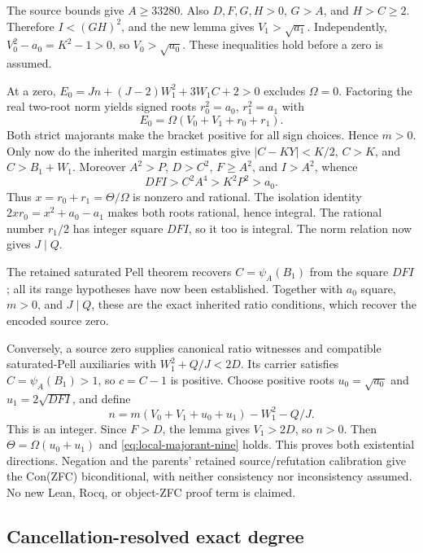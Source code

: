The source bounds give $A\ge33280$. Also $D,F,G,H>0$, $G>A$, and
$H>C\ge2$. Therefore $I<(GH)^2$, and the new lemma gives
$V_1>\sqrt{a_1}$. Independently,
$V_0^2-a_0=K^2-1>0$, so $V_0>\sqrt{a_0}$.
These inequalities hold before a zero is assumed.

At a zero, $E_0=Jn+(J-2)W_1^2+3W_1C+2>0$ excludes $\Omega=0$.
Factoring the real two-root norm yields signed roots
$r_0^2=a_0$, $r_1^2=a_1$ with
\[
 E_0=\Omega(V_0+V_1+r_0+r_1).
\]
Both strict majorants make the bracket positive for all sign choices.
Hence $m>0$. Only now do the inherited margin estimates give
$|C-KY|<K/2$, $C>K$, and $C>B_1+W_1$.
Moreover $A^2>P$, $D>C^2$, $F\ge A^2$, and $I>A^2$, whence
\[
 DFI>C^2A^4>K^2P^2>a_0.
\]
Thus $x=r_0+r_1=\Theta/\Omega$ is nonzero and rational. The isolation
identity $2xr_0=x^2+a_0-a_1$ makes both roots rational, hence integral.
The rational number $r_1/2$ has integer square $DFI$, so it too is
integral. The norm relation now gives $J\mid Q$.

The retained saturated Pell theorem recovers $C=\psi_A(B_1)$ from the
square $DFI$; all its range hypotheses have now been established.
Together with $a_0$ square, $m>0$, and $J\mid Q$, these are the exact
inherited ratio conditions, which recover the encoded source zero.

Conversely, a source zero supplies canonical ratio witnesses and compatible
saturated-Pell auxiliaries with $W_1^2+Q/J<2D$. Its carrier satisfies
$C=\psi_A(B_1)>1$, so $c=C-1$ is positive. Choose positive roots
$u_0=\sqrt{a_0}$ and $u_1=2\sqrt{DFI}$, and define
\[
 n=m(V_0+V_1+u_0+u_1)-W_1^2-Q/J.
\]
This is an integer. Since $F>D$, the lemma gives $V_1>2D$, so $n>0$.
Then $\Theta=\Omega(u_0+u_1)$ and
\eqref{eq:local-majorant-nine} holds. This proves both existential
directions. Negation and the parents' retained source/refutation
calibration give the Con(ZFC) biconditional, with neither consistency nor
inconsistency assumed. No new Lean, Rocq, or object-ZFC proof term is claimed.

\subsection{Cancellation-resolved exact degree}

